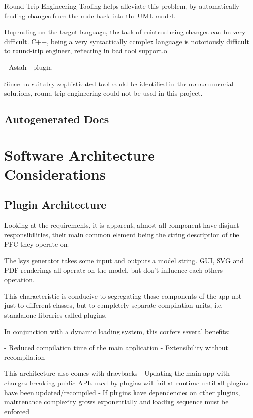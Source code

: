 Round-Trip Engineering Tooling helps alleviate this problem, by automatically feeding changes from the code back into the UML model.

Depending on the target language, the task of reintroducing changes can be very difficult. C++, being a very syntactically complex language is notoriously difficult to round-trip engineer, reflecting in bad tool support.o


- Astah - plugin


Since no suitably sophisticated tool could be identified in the noncommercial solutions, round-trip engineering could not be used in this project.


\subsection{Autogenerated Docs}


\section{Software Architecture Considerations}

\subsection{Plugin Architecture}
Looking at the requirements, it is apparent, almost all component have disjunt responsibilities, their main common element being the string description of the PFC they operate on.

The \gls{lsys} generator takes some input and outputs a model string. GUI, SVG and PDF renderings all operate on the model, but don't influence each others operation.

This characteristic is conducive to segregating those components of the app not just to different classes, but to completely separate compilation units, i.e. standalone libraries called plugins.

In conjunction with a dynamic loading system, this confers several benefits:

- Reduced compilation time of the main application
- Extensibility without recompilation
- 

This architecture also comes with drawbacks
- Updating the main app with changes breaking public APIs used by plugins will fail at runtime until all plugins have been updated/recompiled
- If plugins have dependencies on other plugins, maintenance complexity grows exponentially and loading sequence must be enforced

